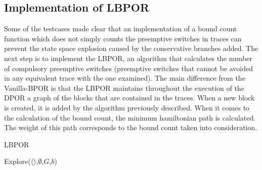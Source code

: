 
\subsection{Implementation of LBPOR}

Some of the testcases made clear that an implementation of a bound count function which does not simply counts the preemptive switches in traces can prevent
the state space explosion caused by the conservative branches added. The next step is to implement the LBPOR, an algorithm that calculates the number of compulsory
preemptive switches (preemptive switches that cannot be avoided in any equivalent trace with the one examined). The main difference from the Vanilla-BPOR is that
the LBPOR maintains throughout the execution of the DPOR a graph of the blocks that are contained in the traces. When a new block is created, it is added by the
algorithm previously described. When it comes to the calculation of the bound count, the minimum hamiltonian path is calculated. The weight of this path corresponds
to the bound count taken into consideration.

\begin{algorithm}
    \caption{LBPOR}
    \label{LBPOR}
    Explore($\langle \rangle$,$\emptyset$,$G$,$b$)\;
\end{algorithm}


